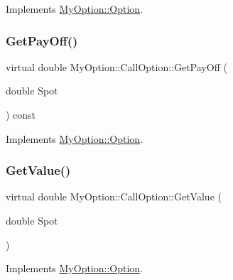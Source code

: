 Implements \hyperlink{classMyOption_1_1Option_a4416faa432b5004e449394056c7f1363}{My\+Option\+::\+Option}.

\hypertarget{classMyOption_1_1CallOption_ad1ee991cfd969e450d7d227dee61be05}{}\label{classMyOption_1_1CallOption_ad1ee991cfd969e450d7d227dee61be05} 
\subsubsection{\texorpdfstring{Get\+Pay\+Off()}{GetPayOff()}}
{\footnotesize\ttfamily virtual double My\+Option\+::\+Call\+Option\+::\+Get\+Pay\+Off (\begin{DoxyParamCaption}\item[{double}]{Spot }\end{DoxyParamCaption}) const\hspace{0.3cm}{\ttfamily [virtual]}}



Implements \hyperlink{classMyOption_1_1Option_a4b6b84dc485153ffadfb32afa9bb52f3}{My\+Option\+::\+Option}.

\hypertarget{classMyOption_1_1CallOption_a89cec28009a9c940504b13357842bb49}{}\label{classMyOption_1_1CallOption_a89cec28009a9c940504b13357842bb49} 
\subsubsection{\texorpdfstring{Get\+Value()}{GetValue()}\hspace{0.1cm}{\footnotesize\ttfamily [1/3]}}
{\footnotesize\ttfamily virtual double My\+Option\+::\+Call\+Option\+::\+Get\+Value (\begin{DoxyParamCaption}\item[{double}]{Spot }\end{DoxyParamCaption})\hspace{0.3cm}{\ttfamily [virtual]}}



Implements \hyperlink{classMyOption_1_1Option_aff32b402a5e44fca9e5a22a142fbbdd6}{My\+Option\+::\+Option}.

\hypertarget{classMyOption_1_1CallOption_a19f1aab1a885c9520c033fc27706777e}{}\label{classMyOption_1_1CallOption_a19f1aab1a885c9520c033fc27706777e} 
